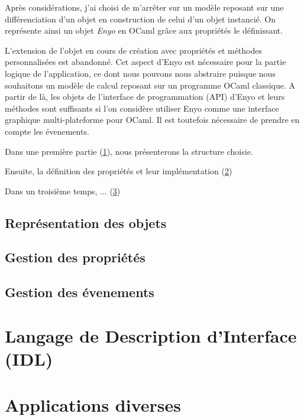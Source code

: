 \documentclass[11pt,a4paper]{report}
\begin{document}
Après considérations, j'ai choisi de m'arrêter sur un modèle reposant sur une différenciation
d'un objet en construction de celui d'un objet instancié. On représente ainsi un objet \emph{Enyo}
en OCaml grâce aux propriétés le définissant.

\medskip
{}
\medskip

L'extension de l'objet en cours de création avec propriétés et méthodes personnalisées est 
abandonné. Cet aspect d'Enyo est nécessaire pour la partie logique de l'application, ce dont 
nous pouvons nous abstraire puisque nous souhaitons un modèle de calcul reposant sur 
un programme OCaml classique.
A partir de là, les objets de l'interface de programmation (API) d'Enyo et leurs méthodes 
sont suffisants si l'on considère utiliser Enyo comme une interface graphique multi-plateforme
pour OCaml. Il est toutefois nécessaire de prendre en compte les évenements.

Dans une première partie (\ref{repobj}), nous présenterons la structure choisie.

Ensuite, la définition des propriétés et leur implémentation (\ref{gestprop})

Dans un troisième temps, ... (\ref{gestevent})

\section{Représentation des objets}\label{repobj}



\section{Gestion des propriétés}\label{gestprop}
\section{Gestion des évenements}\label{gestevent}


\chapter{Langage de Description d'Interface (IDL)}


\chapter{Applications diverses}


\end{document}
